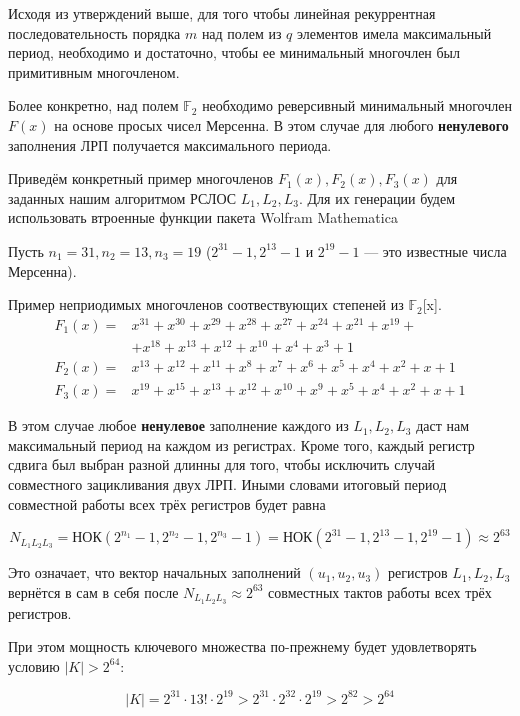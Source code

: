\documentclass[a4paper,12pt]{article}
\theoremstyle{definition}
\begin{document}
	Исходя из утверждений выше, для того чтобы линейная рекуррентная последовательность порядка $m$ над полем из $q$ элементов имела
	максимальный период, необходимо и достаточно, чтобы ее минимальный многочлен был примитивным многочленом.
	
	Более конкретно, над полем $\mathbb{F}_2$ необходимо реверсивный минимальный многочлен $F(x)$ на основе просых чисел Мерсенна. В этом случае для любого \textbf{ненулевого} заполнения ЛРП получается максимального периода.
	
	Приведём конкретный пример многочленов $F_1(x), F_2(x), F_3(x)$ для заданных нашим алгоритмом РСЛОС $L_1, L_2, L_3$. Для их генерации будем использовать втроенные функции пакета Wolfram Mathematica 
	
	Пусть $n_1=31, n_2=13, n_3=19$ ($2^{31}-1, 2^{13}-1$ и $2^{19}-1$ --- это известные числа Мерсенна).
	
	Пример неприодимых многочленов соотвествующих степеней из $\mathbb{F}_2$[x].
	\begin{align*}
		F_1(x) =& x^{31} + x^{30} + x^{29} + x^{28} + x^{27} + x^{24} + x^{21} + x^{19} + \\
			    &+ x^{18} + x^{13} + x^{12} + x^{10} + x^4 + x^3 + 1 \\[2ex]
		F_2(x) =& x^{13} + x^{12} + x^{11} + x^8 + x^7 + x^6 + x^5 + x^4 + x^2 + x + 1 \\[2ex]
		F_3(x) =& x^{19} + x^{15} + x^{13} + x^{12} + x^{10} + x^9 + x^5 + x^4 + x^2 + x + 1 
	\end{align*}
	
	В этом случае любое \textbf{ненулевое} заполнение каждого из $L_1, L_2, L_3$ даст нам максимальный период на каждом из регистрах. Кроме того, каждый регистр сдвига был выбран разной длинны для того, чтобы исключить случай совместного зацикливания двух ЛРП. Иными словами итоговый период совместной работы всех трёх регистров будет равна 
	
	\[ N_{L_1 L_2 L_3} = \text{НОК}(2^{n_1}-1, 2^{n_2}-1, 2^{n_3}-1) = \text{НОК}(2^{31}-1, 2^{13}-1, 2^{19}-1) \approx 2^{63} \]

	Это означает, что вектор начальных заполнений $(u_1, u_2, u_3)$ регистров $L_1, L_2, L_3$ вернётся в сам в себя после $N_{L_1 L_2 L_3} \approx 2^{63} $ совместных тактов работы всех трёх регистров.
	
	При этом мощность ключевого множества по-прежнему будет удовлетворять условию $|K| > 2^{64}$:
	
	\[ |K| = 2^{31} \cdot 13! \cdot 2^{19} > 2^{31} \cdot 2^{32} \cdot 2^{19} > 2^{82} > 2^{64} \]
	
\end{document}
